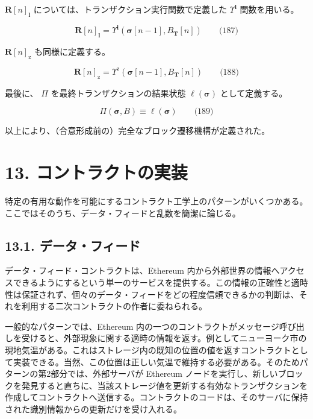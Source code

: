 \documentclass[
]{ltjsarticle}
\begin{document}
\(\mathbf{R}[n]_{\mathbf{l}}\)
については、トランザクション実行関数で定義した
\protect\hyperlink{Upsilon_pow_l}{\(\Upsilon^{\mathbf{l}}\)}
関数を用いる。

\protect\hypertarget{eq-187}{}{}

\[\mathbf{R}[n]_{\mathbf{l}} =
\Upsilon^{\mathbf{l}}(\boldsymbol{\sigma}[n - 1], B_{\mathbf{T}}[n]) \qquad \text{(187)}\]

\protect\hyperlink{Upsilon_pow_z}{\(\mathbf{R}[n]_{\mathrm{z}}\)}
も同様に定義する。

\protect\hypertarget{eq-188}{}{}

\[\mathbf{R}[n]_{\mathrm{z}} =
\Upsilon^{\mathrm{z}}(\boldsymbol{\sigma}[n - 1], B_{\mathbf{T}}[n]) \qquad \text{(188)}\]

\hypertarget{Pi}{}

最後に、 \(\Pi\) を最終トランザクションの結果状態
\(\ell(\boldsymbol{\sigma})\) として定義する。

\protect\hypertarget{eq-189}{}{}

\[\Pi(\boldsymbol{\sigma}, B) \equiv \ell(\boldsymbol{\sigma}) \qquad \text{(189)}\]

以上により、（合意形成前の）完全なブロック遷移機構が定義された。

\hypertarget{ux30b3ux30f3ux30c8ux30e9ux30afux30c8ux306eux5b9fux88c5}{%
\section{13.
コントラクトの実装}\label{ux30b3ux30f3ux30c8ux30e9ux30afux30c8ux306eux5b9fux88c5}}

特定の有用な動作を可能にするコントラクト工学上のパターンがいくつかある。ここではそのうち、データ・フィードと乱数を簡潔に論じる。

\hypertarget{ux30c7ux30fcux30bfux30d5ux30a3ux30fcux30c9}{%
\subsection{13.1.
データ・フィード}\label{ux30c7ux30fcux30bfux30d5ux30a3ux30fcux30c9}}

データ・フィード・コントラクトは、Ethereum
内から外部世界の情報へアクセスできるようにするという単一のサービスを提供する。この情報の正確性と適時性は保証されず、個々のデータ・フィードをどの程度信頼できるかの判断は、それを利用する二次コントラクトの作者に委ねられる。

一般的なパターンでは、Ethereum
内の一つのコントラクトがメッセージ呼び出しを受けると、外部現象に関する適時の情報を返す。例としてニューヨーク市の現地気温がある。これはストレージ内の既知の位置の値を返すコントラクトとして実装できる。当然、この位置は正しい気温で維持する必要がある。そのためパターンの第2部分では、外部サーバが
Ethereum
ノードを実行し、新しいブロックを発見すると直ちに、当該ストレージ値を更新する有効なトランザクションを作成してコントラクトへ送信する。コントラクトのコードは、そのサーバに保持された識別情報からの更新だけを受け入れる。
\end{document}
